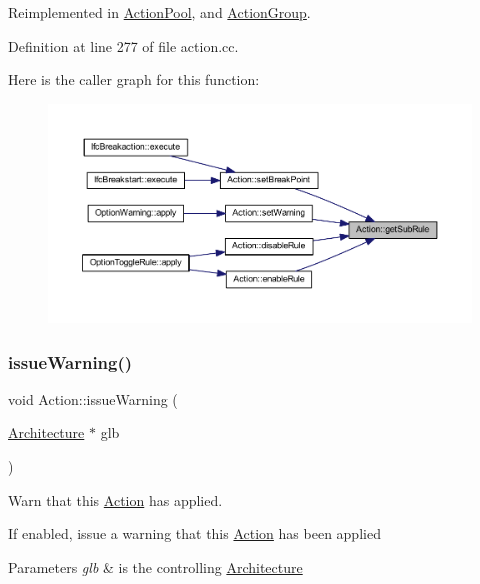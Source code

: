 Reimplemented in \mbox{\hyperlink{class_action_pool_ab3fa9090810784f45c832c641947fb2e}{Action\+Pool}}, and \mbox{\hyperlink{class_action_group_acf178e5772a5fba9fb8f11e8dadba126}{Action\+Group}}.



Definition at line 277 of file action.\+cc.

Here is the caller graph for this function\+:
\nopagebreak
\begin{figure}[H]
\begin{center}
\leavevmode
\includegraphics[width=350pt]{class_action_aacd1f960b27f1b02d27a49aaa61c895a_icgraph}
\end{center}
\end{figure}
\mbox{\label{class_action_a04e458190e48fb7aeeb49088b92488bd}} 
\subsubsection{\texorpdfstring{issueWarning()}{issueWarning()}}
{\footnotesize\ttfamily void Action\+::issue\+Warning (\begin{DoxyParamCaption}\item[{\mbox{\hyperlink{class_architecture}{Architecture}} $\ast$}]{glb }\end{DoxyParamCaption})\hspace{0.3cm}{\ttfamily [protected]}}



Warn that this \mbox{\hyperlink{class_action}{Action}} has applied. 

If enabled, issue a warning that this \mbox{\hyperlink{class_action}{Action}} has been applied 
\begin{DoxyParams}{Parameters}
{\em glb} & is the controlling \mbox{\hyperlink{class_architecture}{Architecture}} \\
\hline
\end{DoxyParams}


